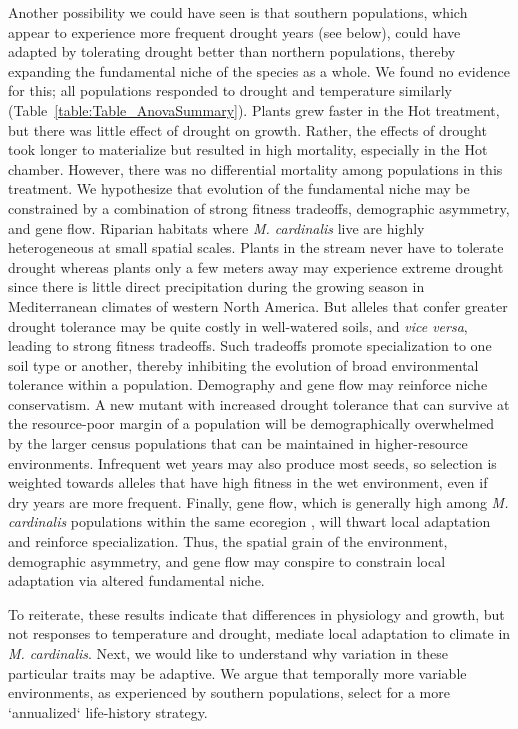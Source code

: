 \documentclass[11pt, oneside]{article}
\begin{document}
Another possibility we could have seen is that southern populations, which appear to experience more frequent drought years (see below), could have adapted by tolerating drought better than northern populations, thereby expanding the fundamental niche of the species as a whole. We found no evidence for this; all populations responded to drought and temperature similarly (Table~\ref{table:Table_AnovaSummary}). Plants grew faster in the Hot treatment, but there was little effect of drought on growth. Rather, the effects of drought took longer to materialize but resulted in high mortality, especially in the Hot chamber. However, there was no differential mortality among populations in this treatment. We hypothesize that evolution of the fundamental niche may be constrained by a combination of strong fitness tradeoffs, demographic asymmetry, and gene flow. Riparian habitats where \textit{M. cardinalis} live are highly heterogeneous at small spatial scales. Plants in the stream never have to tolerate drought whereas plants only a few meters away may experience extreme drought since there is little direct precipitation during the growing season in Mediterranean climates of western North America. But alleles that confer greater drought tolerance may be quite costly in well-watered soils, and \textit{vice versa}, leading to strong fitness tradeoffs. Such tradeoffs promote specialization to one soil type or another, thereby inhibiting the evolution of broad environmental tolerance within a population. Demography and gene flow may reinforce niche conservatism. A new mutant with increased drought tolerance that can survive at the resource-poor margin of a population will be demographically overwhelmed by the larger census populations that can be maintained in higher-resource environments. Infrequent wet years may also produce most seeds, so selection is weighted towards alleles that have high fitness in the wet environment, even if dry years are more frequent. Finally, gene flow, which is generally high among \textit{M. cardinalis} populations within the same ecoregion \citep{Paul_etal_2016}, will thwart local adaptation and reinforce specialization. Thus, the spatial grain of the environment, demographic asymmetry, and gene flow may conspire to constrain local adaptation via altered fundamental niche.

To reiterate, these results indicate that differences in physiology and growth, but not responses to temperature and drought, mediate local adaptation to climate in \textit{M. cardinalis}. Next, we would like to understand why variation in these particular traits may be adaptive. We argue that temporally more variable environments, as experienced by southern populations, select for a more `annualized` life-history strategy. 
\end{document}
